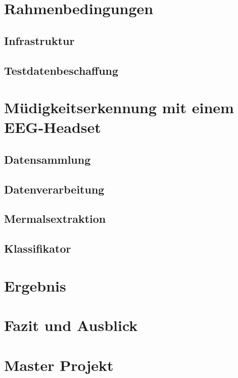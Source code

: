 \chapter{Rahmenbedingungen}


\section{Infrastruktur}


\section{Testdatenbeschaffung}



\chapter{Müdigkeitserkennung mit einem EEG-Headset}


\section{Datensammlung}


\section{Datenverarbeitung}


\section{Mermalsextraktion}


\section{Klassifikator}



\chapter{Ergebnis}


\chapter{Fazit und Ausblick}


\chapter{Master Projekt}


\cleardoublepage 


\cleardoublepage



